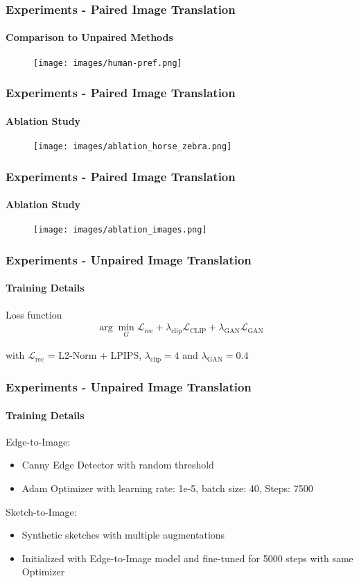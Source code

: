 \documentclass[aspectratio=169, lecture, amberg]{OTHAWbeamer}
\begin{document}
\begin{frame}
    \frametitle{Experiments - Paired Image Translation}
    \framesubtitle{Comparison to Unpaired Methods}
    \begin{figure}
        \centering
        \texttt{[image: images/human-pref.png]}
        
    \end{figure}
\end{frame}


\begin{frame}
\frametitle{Experiments - Paired Image Translation}
\framesubtitle{Ablation Study}
\begin{figure}
    \centering
    \texttt{[image: images/ablation\_horse\_zebra.png]}
    
\end{figure}
\end{frame}

\begin{frame}
    \frametitle{Experiments - Paired Image Translation}
    \framesubtitle{Ablation Study}
    \begin{figure}
        \centering
        \texttt{[image: images/ablation\_images.png]}
        
    \end{figure}
    \end{frame}
\begin{frame}
\frametitle{Experiments - Unpaired Image Translation}
\framesubtitle{Training Details}
\begin{block}{Loss function}
    \begin{align}
        \arg \underset{G}{\min} \mathcal{L}_{\text{rec}} + \lambda _{\text{clip}} \mathcal{L}_{\text{CLIP}} + \lambda_{\text{GAN}}\mathcal{L}_{\text{GAN}}
    \end{align}
\end{block}
with $\mathcal{L}_{\text{rec}}$ = L2-Norm + LPIPS, $\lambda_{\text{clip}} = 4$ and $\lambda_{\text{GAN}} = 0.4$
\end{frame}

\begin{frame}
    \frametitle{Experiments - Unpaired Image Translation}
    \framesubtitle{Training Details}
        Edge-to-Image:
        \begin{itemize}
            \item Canny Edge Detector with random threshold
            \item Adam Optimizer with learning rate: 1e-5, batch size: 40, Steps: 7500
        \end{itemize}
        Sketch-to-Image:
        \begin{itemize}
            \item Synthetic sketches with multiple augmentations
            \item Initialized with Edge-to-Image model and fine-tuned for 5000 steps with same Optimizer
        \end{itemize}
\end{frame}
\end{document}
